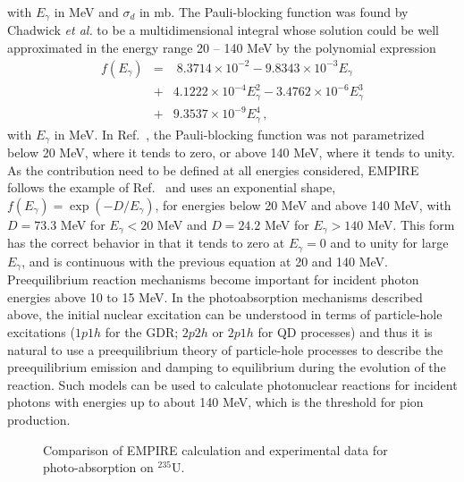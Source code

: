 with $E_{\gamma}$ in MeV and $\sigma_{d}$ in mb. The Pauli-blocking function
was found by Chadwick \emph{et al.} to be a multidimensional integral whose
solution could be well approximated in the energy range 20 -- 140 MeV by the
polynomial expression
\begin{eqnarray}
f(E_{\gamma}) & = & \;8.3714\times10^{-2}-9.8343\times10^{-3}E_{\gamma}
\nonumber \\
&+&4.1222\times10^{-4}E_{\gamma}^{2} -3.4762\times10^{-6}E_{\gamma}^{3}
\nonumber \\
&+&9.3537\times10^{-9}E_{\gamma}^{4}\,,
\end{eqnarray}
with $E_{\gamma}$ in MeV. In Ref.~\cite{chadQD}, the Pauli-blocking function
was not parametrized below 20 MeV, where it tends to zero, or above 140 MeV,
where it tends to unity. As the contribution need to be defined at all
energies considered, EMPIRE follows the example of Ref.~\cite{PHNuc} and
uses an exponential shape, $f(E_{\gamma})=\exp(-D/E_{\gamma})$, for energies
below 20 MeV and above 140 MeV, with $D=73.3$ MeV for $E_{\gamma}<20$ MeV
and $D=24.2$ MeV for $E_{\gamma}>140$ MeV. This form has the correct
behavior in that it tends to zero at $E_{\gamma}=0$ and to unity for large $%
E_{\gamma}$, and is continuous with the previous equation at 20 and 140 MeV.
Preequilibrium reaction mechanisms become important for incident photon
energies above 10 to 15 MeV. In the photoabsorption mechanisms described
above, the initial nuclear excitation can be understood in terms of
particle-hole excitations ($1p1h$ for the GDR; $2p2h$ or $2p1h$ for QD
processes) and thus it is natural to use a preequilibrium theory of
particle-hole processes to describe the preequilibrium emission and damping
to equilibrium during the evolution of the reaction. Such models can be used
to calculate photonuclear reactions for incident photons with energies up to
about 140 MeV, which is the threshold for pion production.
\begin{figure}[htbp]
\caption{Comparison of EMPIRE calculation and experimental data for
photo-absorption on $^{235}$U.}
\label{u235abs}
\end{figure}

